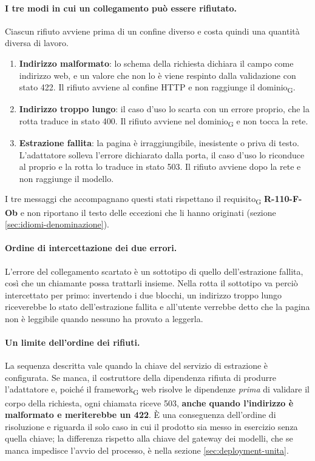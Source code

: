\documentclass[a4paper, 10pt]{article}
\begin{document}
\paragraph{I tre modi in cui un collegamento può essere rifiutato.}
Ciascun rifiuto avviene prima di un confine diverso e costa quindi una quantità diversa di lavoro.

\begin{enumerate}
    \setlength{\itemsep}{3pt}
    \item \textbf{Indirizzo malformato}: lo schema della richiesta dichiara il campo come indirizzo web, e un valore che non lo è viene respinto dalla validazione con stato 422. Il rifiuto avviene al confine HTTP e non raggiunge il dominio\textsubscript{G}.
    \item \textbf{Indirizzo troppo lungo}: il caso d'uso lo scarta con un errore proprio, che la rotta traduce in stato 400. Il rifiuto avviene nel dominio\textsubscript{G} e non tocca la rete.
    \item \textbf{Estrazione fallita}: la pagina è irraggiungibile, inesistente o priva di testo. L'adattatore solleva l'errore dichiarato dalla porta, il caso d'uso lo riconduce al proprio e la rotta lo traduce in stato 503. Il rifiuto avviene dopo la rete e non raggiunge il modello.
\end{enumerate}

\noindent I tre messaggi che accompagnano questi stati rispettano il requisito\textsubscript{G} \textbf{R-110-F-Ob} e non riportano il testo delle eccezioni che li hanno originati (sezione \ref{sec:idiomi-denominazione}).

\paragraph{Ordine di intercettazione dei due errori.}
L'errore del collegamento scartato è un sottotipo di quello dell'estrazione fallita, così che un chiamante possa trattarli insieme. Nella rotta il sottotipo va perciò intercettato per primo: invertendo i due blocchi, un indirizzo troppo lungo riceverebbe lo stato dell'estrazione fallita e all'utente verrebbe detto che la pagina non è leggibile quando nessuno ha provato a leggerla.

\paragraph{Un limite dell'ordine dei rifiuti.}
La sequenza descritta vale quando la chiave del servizio di estrazione è configurata. Se manca, il costruttore della dipendenza rifiuta di produrre l'adattatore e, poiché il framework\textsubscript{G} web risolve le dipendenze \textit{prima} di validare il corpo della richiesta, ogni chiamata riceve 503, \textbf{anche quando l'indirizzo è malformato e meriterebbe un 422}. È una conseguenza dell'ordine di risoluzione e riguarda il solo caso in cui il prodotto sia messo in esercizio senza quella chiave; la differenza rispetto alla chiave del gateway dei modelli, che se manca impedisce l'avvio del processo, è nella sezione \ref{sec:deployment-unita}.
\end{document}
